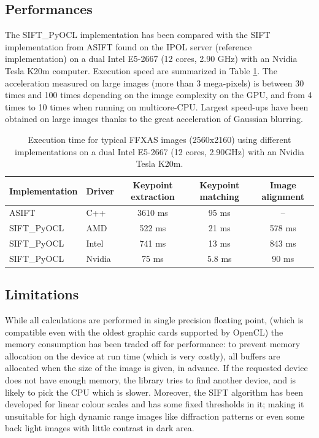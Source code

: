 \documentclass[preprint]{iucr}
\begin{document}
\subsection{Performances}

The SIFT\_PyOCL implementation has been compared with the SIFT
implementation from ASIFT \cite{ASIFT} found on the IPOL server (reference
implementation) on a dual Intel E5-2667 (12 cores, 2.90 GHz) with an Nvidia
Tesla K20m computer. Execution speed are summarized in Table \ref{bench}.
The acceleration measured on large images (more than 3 mega-pixels) is between
30 times and 100 times depending on the image complexity on the GPU, and from 4
times to 10 times when running on multicore-CPU.
Largest speed-ups have been obtained on large images thanks to the
great acceleration of Gaussian blurring.

\begin{table}
\caption{Execution time for typical FFXAS images (2560x2160) using different
implementations on a dual Intel E5-2667 (12 cores, 2.90GHz) with an Nvidia Tesla
K20m.}
\label{bench}
\vspace{1mm}
\begin{center}
\begin{tabular}{l l ccc}
Implementation & Driver & Keypoint extraction & Keypoint matching &
Image alignment\\
\hline
ASIFT        &   C++     &   3610 ms  & 95 ms  & --  \\
SIFT\_PyOCL  &   AMD  &   522 ms  &  21 ms&  578 ms \\
SIFT\_PyOCL  &   Intel  &   741 ms  &  13 ms&  843 ms\\
SIFT\_PyOCL  &   Nvidia  &    75 ms  &  5.8 ms & 90 ms\\
\end{tabular}
\end{center}
\end{table}



\subsection{Limitations}
While all calculations are performed in single precision floating point,
(which is compatible even with the oldest graphic cards supported by OpenCL) 
the memory consumption has been traded off for performance: to prevent memory
allocation on the device at run time (which is very costly), all buffers are
allocated when the size of the image is given, in advance. If the
requested device does not have enough memory, the library tries to find another
device, and is likely to pick the CPU which is slower.
Moreover, the SIFT algorithm has been developed for linear colour scales and
has some fixed thresholds in it; making it unsuitable for high dynamic
range images like diffraction patterns or even some back light images with
little contrast in dark area.
\end{document}
